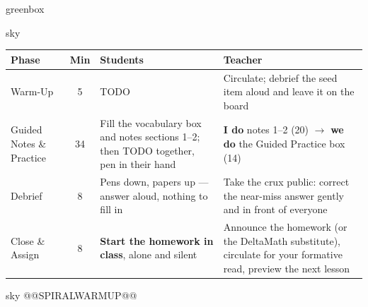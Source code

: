 \documentclass[10pt]{article}
\begin{document}
\begin{skillbox}{greenbox}
\end{skillbox}

\boxguard[30]
\begin{skillbox}{sky}
\renewcommand{\arraystretch}{1.25}
\begin{tabularx}{\linewidth}{@{}l c X X@{}}
\textbf{Phase} & \textbf{Min} & \textbf{Students} & \textbf{Teacher} \\
\hline
Warm-Up & 5 & TODO & Circulate; debrief the seed item aloud and leave it on the board \\
Guided Notes \& Practice & 34 & Fill the vocabulary box and notes sections 1--2; then TODO together, pen in their hand & \textbf{I do} notes 1--2 (20) $\to$ \textbf{we do} the Guided Practice box (14) \\
Debrief & 8 & Pens down, papers up --- answer aloud, nothing to fill in & Take the crux public: correct the near-miss answer gently and in front of everyone \\
Close \& Assign & 8 & \textbf{Start the homework in class}, alone and silent & Announce the homework (or the DeltaMath substitute), circulate for your formative read, preview the next lesson \\
\end{tabularx}
\end{skillbox}

\boxguard[20]
\begin{skillbox}{sky}
@@SPIRALWARMUP@@
\end{skillbox}
\end{document}
